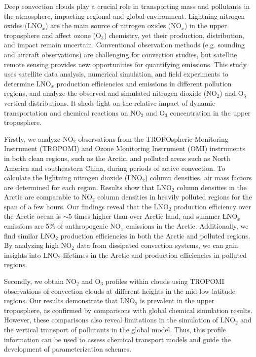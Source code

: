 {
Deep convection clouds play a crucial role in transporting mass and pollutants in the atmosphere, impacting regional and global environment.
Lightning nitrogen oxides (LNO$_x$) are the main source of nitrogen oxides (NO$_x$) in the upper troposphere
and affect ozone (O$_3$) chemistry, yet their production, distribution, and impact remain uncertain.
Conventional observation methods (e.g. sounding and aircraft observations) are challenging for convection studies,
but satellite remote sensing provides new opportunities for quantifying emissions.
This study uses satellite data analysis, numerical simulation, and field experiments to determine LNO$_x$ production efficiencies and emissions in different pollution regions,
and analyze the observed and simulated nitrogen dioxide (NO$_2$) and O$_3$ vertical distributions.
It sheds light on the relative impact of dynamic transportation and chemical reactions on NO$_2$ and O$_3$ concentration in the upper troposphere.

Firstly, we analyze NO$_2$ observations from the TROPOspheric Monitoring Instrument (TROPOMI) and
Ozone Monitoring Instrument (OMI) instruments in both clean regions, such as the Arctic, and polluted areas such as North America and southeastern China, during periods of active convection.
To calculate the lightning nitrogen dioxide (LNO$_2$) column densities, air mass factors are determined for each region.
Results show that LNO$_2$ column densities in the Arctic are comparable to NO$_2$ column densities in heavily polluted regions for the span of a few hours.
Our findings reveal that the LNO$_2$ production efficiency over the Arctic ocean is $\sim$5 times higher than over Arctic land, and summer LNO$_x$ emissions are 5\% of anthropogenic NO$_x$ emissions in the Arctic.
Additionally, we find similar LNO$_2$ production efficiencies in both the Arctic and polluted regions.
By analyzing high NO$_2$ data from dissipated convection systems, we can gain insights into LNO$_2$ lifetimes in the Arctic and production efficiencies in polluted regions.

Secondly, we obtain NO$_2$ and O$_3$ profiles within clouds using TROPOMI observations of convection clouds at different heights in the mid-low latitude regions.
Our results demonstrate that LNO$_2$ is prevalent in the upper troposphere, as confirmed by comparisons with global chemical simulation results.
However, these comparisons also reveal limitations in the simulation of LNO$_2$ and the vertical transport of pollutants in the global model.
Thus, this profile information can be used to assess chemical transport models and guide the development of parameterization schemes.

}
